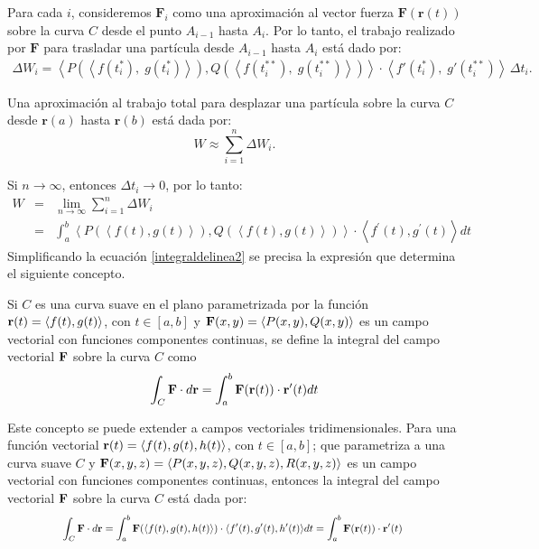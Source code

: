 Para cada $i$, consideremos $\mathbf{F}_i$ como una aproximación al vector fuerza
$\mathbf{F}(\mathbf{r}(t))$ sobre la curva $C$ desde el punto $A_{i-1}$ hasta $A_i$. Por lo tanto, el trabajo realizado por $\mathbf{F}$ para trasladar una partícula desde $A_{i-1}$ hasta $A_i$ está dado por:
{\small
  \begin{multline*}
    \Delta W_i =
    \left\langle
    P\left( \left\langle f(t_i^{\ast}),\; g(t_i^{\ast}) \right\rangle \right),
    Q\left( \left\langle f(t_i^{\ast\ast}),\; g(t_i^{\ast\ast}) \right\rangle \right)
    \right\rangle \cdot
    \left\langle f'(t_i^{\ast}),\; g'(t_i^{\ast\ast}) \right\rangle \, \Delta t_i.
  \end{multline*}
}

Una aproximación al trabajo total para desplazar una partícula sobre la curva $C$ desde $\mathbf{r}(a)$ hasta $\mathbf{r}(b)$ está dada por:
\[
  W \approx \sum_{i=1}^{n} \Delta W_i.
\]

Si $n \to \infty$, entonces $\Delta t_i \to 0$, por lo tanto:
\begin{eqnarray}
  W &=& \lim_{n\rightarrow\infty}\sum_{i=1}^{n}\Delta W_{i} \nonumber \\
  &=& \int_{a}^{b}\left\langle P\left( \left\langle f(t) ,g\left(t\right) \right\rangle \right) ,Q\left( \left\langle f(t)
  ,g(t) \right\rangle \right) \right\rangle \cdot \left\langle f^{\prime }(t) ,g^{\prime }(t) \right\rangle dt \label{integraldelinea2}
\end{eqnarray}
Simplificando la ecuación \ref{integraldelinea2} se precisa la expresión que determina el siguiente concepto.

\begin{defi}
  Si $C$ es una curva suave en el plano parametrizada por la función ${\bf r}(t)=\langle f(t),g(t)\rangle$, con $t \in [a,b]$
  y ${\bf F}(x,y)= \langle P(x,y),Q(x,y)\rangle $ es un campo vectorial con funciones componentes continuas, se define la integral del campo vectorial ${\bf F}$ sobre la curva $C$ como
  \begin{equation} \label{integraldelinea3}
    \int_C {\bf F} \cdot d {\bf r} =\int_{a}^{b}{\bf F}({\bf r}(t)) \cdot {\bf r}^{\prime }(t) dt
  \end{equation} 
\end{defi}

Este concepto se puede extender a campos vectoriales tridimensionales. Para una función vectorial
{\small ${\bf r}(t)=\langle f(t),g(t),h(t)\rangle$,} con {\small $t \in [a,b]$;}
que parametriza a una curva suave $C$ y {\footnotesize ${\bf F}(x,y,z)= \langle P(x,y,z),Q(x,y,z), R(x,y,z)\rangle$} es un campo vectorial con funciones componentes continuas, entonces la integral del campo vectorial ${\bf F}$ sobre la curva $C$ está dada por:
\begin{equation}\label{integraldelinea7}
  \scalebox{0.82}{%
    $\displaystyle \int_C {\bf F} \cdot d {\bf r} =\int_{a}^{b}{\bf F}(\langle f(t),g(t),h(t)\rangle) \cdot \langle f'(t),g'(t),h'(t)\rangle dt =\int_{a}^{b}{\bf F}({\bf r}(t)) \cdot {\bf r}^{\prime }(t)$
  }
\end{equation}

